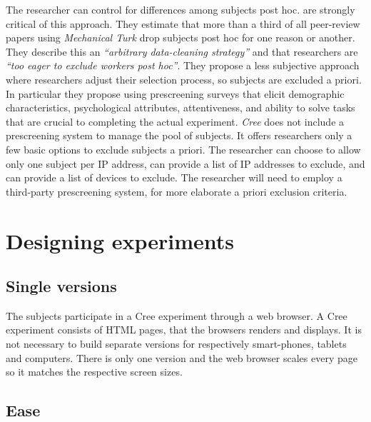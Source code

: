 \documentclass[preprint, 12pt]{elsarticle}
\newcommand{\Cree}{\emph{Cree}\xspace}
\begin{document}
The researcher can control for differences among subjects post hoc. \citet[p. 121]{Chandler_Mueller_Paolacci_2014} are strongly critical of this approach. They estimate that more than a third of all peer-review papers using \emph{Mechanical Turk} drop subjects post hoc for one reason or another. They describe this an \emph{``arbitrary data-cleaning strategy''} and that researchers are \emph{``too eager to exclude workers post hoc''}. They propose a less subjective approach where researchers adjust their selection process, so subjects are excluded a priori. In particular they propose using prescreening surveys that elicit demographic characteristics, psychological attributes, attentiveness, and ability to solve tasks that are crucial to completing the actual experiment. \Cree does not include a prescreening system to manage the pool of subjects. It offers researchers only a few basic options to exclude subjects a priori. The researcher can choose to allow only one subject per IP address, can provide a list of IP addresses to exclude, and can provide a list of devices to exclude. The researcher will need to employ a third-party prescreening system, for more elaborate a priori exclusion criteria.


\section{Designing experiments}
\label{S:Designing}

\subsection{Single versions}

The subjects participate in a Cree experiment through a web browser. A Cree experiment consists of HTML pages, that the browsers renders and displays. It is not necessary to build separate versions for respectively smart-phones, tablets and computers. There is only one version and the web browser scales every page so it matches the respective screen sizes. 

\subsection{Ease}
\end{document}
